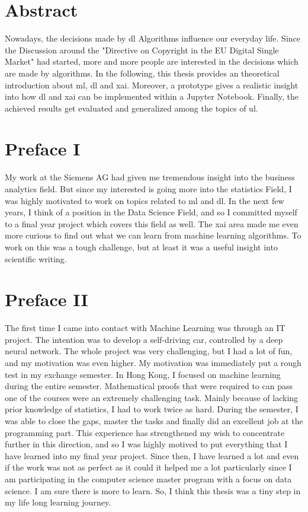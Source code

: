 
\section*{Abstract}
\label{sec:abstract}

Nowadays, the decisions made by \gls{dl} Algorithms influence our everyday life. Since the Discussion around the "Directive on Copyright in the EU Digital Single Market" had started, more and more people are interested in the decisions which are made by algorithms. In the following, this thesis provides an theoretical introduction about \gls{ml}, \gls{dl} and \gls{xai}. Moreover, a prototype gives a realistic insight into how \gls{dl} and \gls{xai} can be implemented within a Jupyter Notebook. Finally, the achieved results get evaluated and generalized among the topics of \gls{ul}.

\section*{Preface I}
My work at the Siemens AG had given me tremendous insight into the business analytics field. But since my interested is going more into the statistics Field, I was highly motivated to work on topics related to  \gls{ml} and  \gls{dl}. In the next few years, I think of a position in the Data Science Field, and so I committed myself to a final year project which covers this field as well. The \gls{xai} area made me even more curious to find out what we can learn from machine learning algorithms. To work on this was a tough challenge,  but at least it was a useful insight into scientific writing. 

\section*{Preface II}

The first time I came into contact with Machine Learning was through an IT project. The intention was to develop a self-driving car, controlled by a deep neural network. The whole project was very challenging, but I had a lot of fun, and my motivation was even higher. My motivation was immediately put a rough test in my exchange semester. In Hong Kong, I focused on machine learning during the entire semester.  Mathematical proofs that were required to can pass one of the courses were an extremely challenging task. Mainly because of lacking prior knowledge of statistics, I had to work twice as hard. During the semester,  I was able to close the gaps, master the tasks and finally did an excellent job at the programming part. This experience has strengthened my wish to concentrate further in this direction, and so I was highly motived to put everything that I have learned into my final year project. Since then, I have learned a lot and even if the work was not as perfect as it could it helped me a lot particularly since I am participating in the computer science master program with a focus on data science. I am sure there is more to learn. So,  I think this thesis was a tiny step in my life long learning journey.